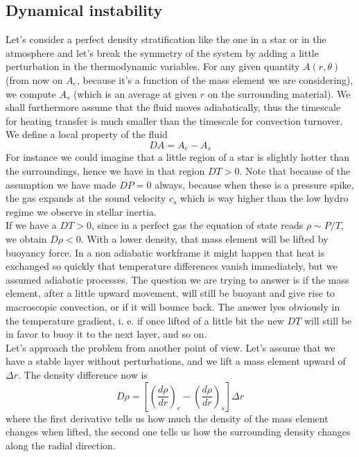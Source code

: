 \subsection{Dynamical instability}
Let's consider a perfect density stratification like the one in a star or in the atmosphere and let's break the symmetry of the system by adding a little perturbation in the thermodynamic variables. For any given quantity $A(r, \theta)$ (from now on $A_e$, because it's a function of the mass element we are considering), we compute $A_s$ (which is an average at given $r$ on the surrounding material). We shall furthermore assume that the fluid moves adiabatically, thus the timescale for heating transfer is much smaller than the timescale for convection turnover. \\
We define a local property of the fluid 
$$
DA=A_e - A_s
$$
For instance we could imagine that a little region of a star is slightly hotter than the surroundings, hence we have in that region $DT > 0$. Note that because of the assumption we have made $DP=0$ always, because when these is a pressure spike, the gas expands at the sound velocity $c_s$ which is way higher than the low hydro regime we observe in stellar inertia.\\
If we have a $DT>0$, since in a perfect gas the equation of state reads $\rho \sim P/T$, we obtain $D \rho < 0$. With a lower density, that mass element will be lifted by buoyancy force. In a non adiabatic workframe it might happen that heat is exchanged so quickly that temperature differences vanish immediately, but we assumed adiabatic processes. The question we are trying to answer is if the mass element, after a little upward movement, will still be buoyant and give rise to macroscopic convection, or if it will bounce back. The answer lyes obviously in the temperature gradient, i. e. if once lifted of a little bit the new $DT$ will still be in favor to buoy it to the next layer, and so on. \\
Let's approach the problem from another point of view. Let's assume that we have a stable layer without perturbations, and we lift a mass element upward of $\Delta r$. The density difference now is
\begin{equation}\label{displacement}
D \rho = \left [  \left( \frac{d \rho}{d r} \right)_e - \left( \frac{d \rho}{d r} \right)_s   \right ] \Delta r
\end{equation}
where the first derivative tells us how much the density of the mass element changes when lifted, the second one tells us how the surrounding density changes along the radial direction. \\
